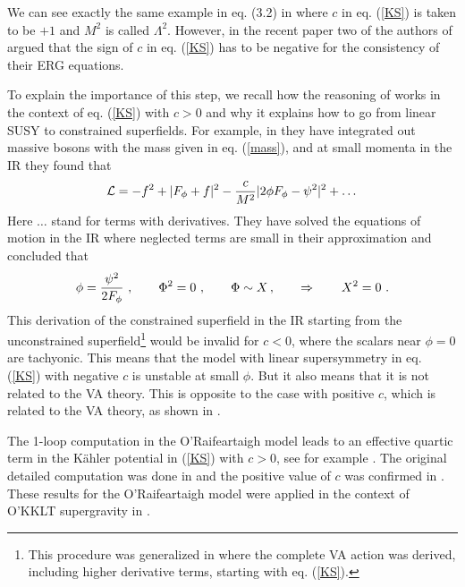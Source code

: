 \documentclass[11pt]{article}
\newcommand{\be}{\begin{equation}}
\newcommand{\ee}{\end{equation}}
\def\K{K{\"a}hler }
\newcommand{\rf}[1]{(\ref{#1})}
\def\be{\begin{equation}}
\def\ee{\end{equation}}
\begin{document}
We can see exactly the same example in eq. (3.2) in \cite{Cribiori:2017ngp}  where $c$ in eq. \rf{KS}  is taken to be  $+1$ and $M^2$ is called $\Lambda^2$.  However, in the recent paper \cite{DallAgata:2022abm} two of the authors of  \cite{Cribiori:2017ngp} argued that the sign of $c$ in eq. \rf{KS} has to be negative for the consistency of their ERG equations. 

To explain the importance of this step, we recall how the reasoning of  \cite{Komargodski:2009rz,Kallosh:2015pho} works in the context of eq. \rf{KS} with $c>0$ and why it explains how to go from linear SUSY to constrained superfields. For example, in \cite{Komargodski:2009rz} they have integrated out massive bosons with the mass given in eq. \rf{mass}, and at small momenta in the IR they found that 
\be
{\cal L} = - f^2 +|F_\phi + f|^2 - {c\over M^2} |2\phi F_\phi- \psi^2|^2 +\dots
\ee
Here $\dots$ stand for terms with derivatives. They have solved the equations of motion in the IR where neglected terms are small in their approximation and concluded that 
\be
\phi = {\psi^2\over 2F_\phi}\ ,  \qquad \Phi^2=0 \ , \qquad  \Phi \sim X\, ,    \qquad \Rightarrow \qquad X^2=0 \ .
\ee
This derivation of the constrained superfield in the IR starting from the unconstrained superfield\footnote{This procedure was generalized in \cite{Kallosh:2015pho} where the complete VA action was derived, including higher derivative terms, starting with eq. \rf{KS}.}
 would  be invalid for $c<0$, where the scalars near $\phi=0$ are tachyonic. 
This means that  the  model with linear supersymmetry in eq. \rf{KS} with negative $c$ is unstable at small $\phi$. But it also means that it is not related to the VA theory. This is opposite to the case with positive  $c$, which is related to the VA theory, as shown in \cite{Komargodski:2009rz,Kallosh:2015pho}. 


The 1-loop computation in the O'Raifeartaigh model leads to an effective quartic term in the \K potential in \rf{KS} with $c>0$, see for example \cite{Komargodski:2009rz}. The original detailed computation was done in    \cite{Huq:1975ue} and the positive value of $c$ was confirmed in  \cite{Witten:1981kv,Intriligator:2007py}.
These results for the O'Raifeartaigh model were applied in  the context of O'KKLT supergravity in 
\cite{Kallosh:2006dv}.
\end{document}

